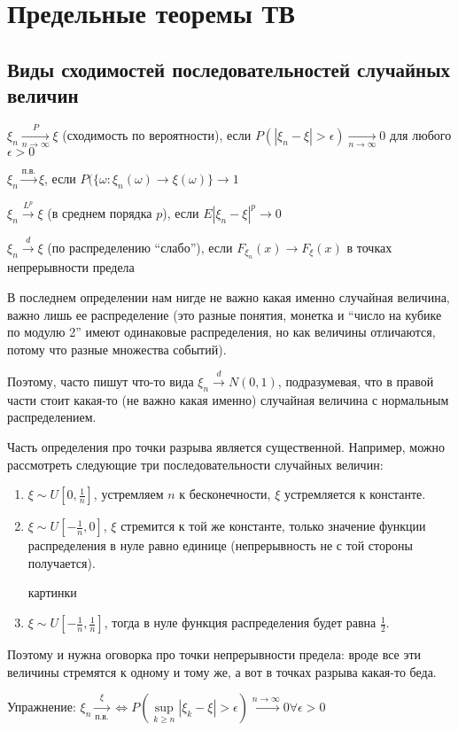 \chapter{Предельные теоремы ТВ}
\section{Виды сходимостей последовательностей случайных величин}
\begin{Def}
$\xi_n \xrightarrow[n \to \infty]{P} \xi$ (сходимость по вероятности), если $P(|\xi_n - \xi| > \epsilon) \xrightarrow[n \to \infty]{} 0$ для любого $\epsilon > 0$

$\xi_n \xrightarrow{\text{п.в.}} \xi$, если $P(\{\omega\colon \xi_n(\omega) \to \xi(\omega)\} \to 1$

$\xi_n \xrightarrow{L^p} \xi$ (в среднем порядка $p$), если $E|\xi_n - \xi|^p \to 0$

$\xi_n \xrightarrow{d} \xi$ (по распределению ``слабо''), если $F_{\xi_n}(x) \to F_\xi(x)$ в точках непрерывности предела
\end{Def}
\begin{Rem}
    В последнем определении нам нигде не важно какая именно случайная величина, важно лишь ее распределение 
    (это разные понятия, монетка и ``число на кубике по модулю 2'' имеют одинаковые распределения, но как величины отличаются, потому что разные множества событий).

    Поэтому, часто пишут что-то вида $\xi_n \xrightarrow{d} N(0, 1)$, подразумевая, что в правой части стоит какая-то (не важно какая именно) случайная величина с нормальным распределением.
\end{Rem}
\begin{Rem}
Часть определения про точки разрыва является существенной.
Например, можно рассмотреть следующие три последовательности случайных величин:

\begin{enumerate}

\item $\xi \sim U[0, \frac1n]$, устремляем $n$ к бесконечности, $\xi$ устремляется к константе.

\item $\xi \sim U[-\frac1n, 0]$, $\xi$ стремится к той же константе, только значение функции распределения в нуле равно единице (непрерывность не с той стороны получается).

\TODO картинки

\item $\xi \sim U[-\frac1n, \frac1n]$, тогда в нуле функция распределения будет равна $\frac12$. 
\end{enumerate}
Поэтому и нужна оговорка про точки непрерывности предела: вроде все эти величины стремятся к одному и тому же, а вот в точках разрыва какая-то беда.

\end{Rem}
Упражнение: $\xi_n \xrightarrow[\text{п.в.}] \xi \Leftrightarrow P(\sup\limits_{k\geq n} |\xi_k - \xi| > \epsilon) \xrightarrow[]{n \to \infty} 0 \forall \epsilon > 0$

